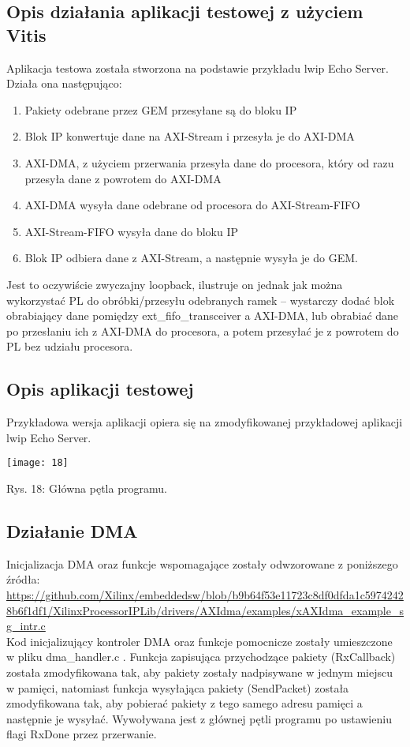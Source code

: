 \documentclass[11pt, letterpaper]{article}
\begin{document}
\subsection{Opis działania aplikacji testowej z użyciem Vitis}
Aplikacja testowa została stworzona na podstawie przykładu lwip Echo Server. Działa ona następująco:
\begin{enumerate}
    \item Pakiety odebrane przez GEM przesyłane są do bloku IP
    \item Blok IP konwertuje dane na AXI-Stream i przesyła je do AXI-DMA
    \item AXI-DMA, z użyciem przerwania przesyła dane do procesora, który od razu przesyła dane z powrotem do AXI-DMA
    \item AXI-DMA wysyła dane odebrane od procesora do AXI-Stream-FIFO
    \item AXI-Stream-FIFO wysyła dane do bloku IP
    \item Blok IP odbiera dane z AXI-Stream, a następnie wysyła je do GEM.
\end{enumerate}
Jest to oczywiście zwyczajny loopback, ilustruje on jednak jak można wykorzystać PL do obróbki/przesyłu odebranych ramek – wystarczy dodać blok obrabiający dane pomiędzy ext\_fifo\_transceiver a AXI-DMA, lub obrabiać dane po przesłaniu ich z AXI-DMA do procesora, a potem przesyłać je z powrotem do PL bez udziału procesora.
\subsection{Opis aplikacji testowej}
Przykładowa wersja aplikacji opiera się na zmodyfikowanej przykładowej aplikacji lwip Echo Server.

\texttt{[image: 18]}
\begin{center}
\caption{Rys. 18: Główna pętla programu.}
\end{center}
\vspace{5mm}

\subsection{Działanie DMA}
Inicjalizacja DMA oraz funkcje wspomagające zostały odwzorowane z poniższego źródła:
\\
\url{https://github.com/Xilinx/embeddedsw/blob/b9b64f53e11723c8df0dfda1c59742428b6f1df1/XilinxProcessorIPLib/drivers/AXIdma/examples/xAXIdma\_example\_sg\_intr.c}
\\
Kod inicjalizujący kontroler DMA oraz funkcje pomocnicze zostały umieszczone w pliku dma\_handler.c . Funkcja zapisująca przychodzące pakiety (RxCallback) została zmodyfikowana tak, aby pakiety zostały nadpisywane w jednym miejscu w pamięci, natomiast funkcja wysyłająca pakiety (SendPacket) została zmodyfikowana tak, aby pobierać pakiety z tego samego adresu pamięci a następnie je wysyłać. Wywoływana jest z głównej pętli programu po ustawieniu flagi RxDone przez przerwanie.
\end{document}
